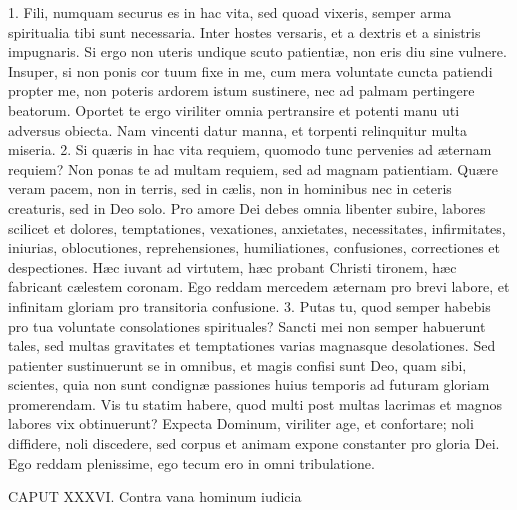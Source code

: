 \documentclass[twoside]{article}
\begin{document}
1. Fili, numquam securus es in hac vita, sed quoad vixeris, semper arma spiritualia tibi sunt necessaria. Inter hostes versaris, et a dextris et a sinistris impugnaris. Si ergo non uteris undique scuto patientiæ, non eris diu sine vulnere. Insuper, si non ponis cor tuum fixe in me, cum mera voluntate cuncta patiendi propter me, non poteris ardorem istum sustinere, nec ad palmam pertingere beatorum. Oportet te ergo viriliter omnia pertransire et potenti manu uti adversus obiecta. Nam vincenti datur manna, et torpenti relinquitur multa miseria.
2. Si quæris in hac vita requiem, quomodo tunc pervenies ad æternam requiem? Non ponas te ad multam requiem, sed ad magnam patientiam. Quære veram pacem, non in terris, sed in cælis, non in hominibus nec in ceteris creaturis, sed in Deo solo. Pro amore Dei debes omnia libenter subire, labores scilicet et dolores, temptationes, vexationes, anxietates, necessitates, infirmitates, iniurias, oblocutiones, reprehensiones, humiliationes, confusiones, correctiones et despectiones. Hæc iuvant ad virtutem, hæc probant Christi tironem, hæc fabricant cælestem coronam. Ego reddam mercedem æternam pro brevi labore, et infinitam gloriam pro transitoria confusione.
3. Putas tu, quod semper habebis pro tua voluntate consolationes spirituales? Sancti mei non semper habuerunt tales, sed multas gravitates et temptationes varias magnasque desolationes. Sed patienter sustinuerunt se in omnibus, et magis confisi sunt Deo, quam sibi, scientes, quia non sunt condignæ passiones huius temporis ad futuram gloriam promerendam. Vis tu statim habere, quod multi post multas lacrimas et magnos labores vix obtinuerunt? Expecta Dominum, viriliter age, et confortare; noli diffidere, noli discedere, sed corpus et animam expone constanter pro gloria Dei. Ego reddam plenissime, ego tecum ero in omni tribulatione.


CAPUT XXXVI.
Contra vana hominum iudicia
\end{document}
